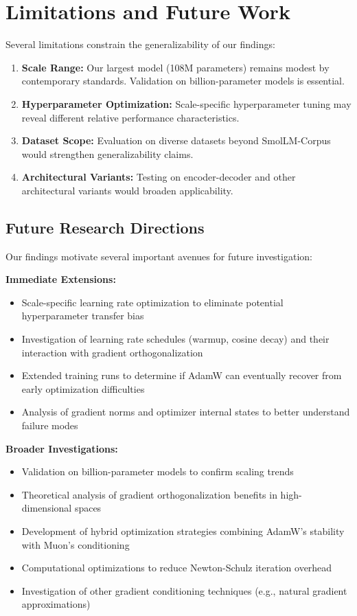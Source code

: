 \documentclass[11pt,a4paper]{article}
\begin{document}
\section{Limitations and Future Work}

Several limitations constrain the generalizability of our findings:

\begin{enumerate}[leftmargin=*]
    \item \textbf{Scale Range:} Our largest model (108M parameters) remains modest by contemporary standards. Validation on billion-parameter models is essential.
    \item \textbf{Hyperparameter Optimization:} Scale-specific hyperparameter tuning may reveal different relative performance characteristics.
    \item \textbf{Dataset Scope:} Evaluation on diverse datasets beyond SmolLM-Corpus would strengthen generalizability claims.
    \item \textbf{Architectural Variants:} Testing on encoder-decoder and other architectural variants would broaden applicability.
\end{enumerate}

\subsection{Future Research Directions}

Our findings motivate several important avenues for future investigation:

\textbf{Immediate Extensions:}
\begin{itemize}[leftmargin=*]
    \item Scale-specific learning rate optimization to eliminate potential hyperparameter transfer bias
    \item Investigation of learning rate schedules (warmup, cosine decay) and their interaction with gradient orthogonalization
    \item Extended training runs to determine if AdamW can eventually recover from early optimization difficulties
    \item Analysis of gradient norms and optimizer internal states to better understand failure modes
\end{itemize}

\textbf{Broader Investigations:}
\begin{itemize}[leftmargin=*]
    \item Validation on billion-parameter models to confirm scaling trends
    \item Theoretical analysis of gradient orthogonalization benefits in high-dimensional spaces
    \item Development of hybrid optimization strategies combining AdamW's stability with Muon's conditioning
    \item Computational optimizations to reduce Newton-Schulz iteration overhead
    \item Investigation of other gradient conditioning techniques (e.g., natural gradient approximations)
\end{itemize}
\end{document}
